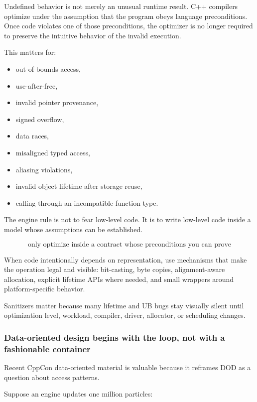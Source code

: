 Undefined behavior is not merely an unusual runtime result. C++ compilers optimize under the assumption that the program obeys language preconditions. Once code violates one of those preconditions, the optimizer is no longer required to preserve the intuitive behavior of the invalid execution.

This matters for:

\begin{itemize}
\tightlist
\item
  out-of-bounds access,
\item
  use-after-free,
\item
  invalid pointer provenance,
\item
  signed overflow,
\item
  data races,
\item
  misaligned typed access,
\item
  aliasing violations,
\item
  invalid object lifetime after storage reuse,
\item
  calling through an incompatible function type.
\end{itemize}

The engine rule is not to fear low-level code. It is to write low-level code inside a model whose assumptions can be established.

\[
\boxed{
\text{only optimize inside a contract whose preconditions you can prove}
}
\]

When code intentionally depends on representation, use mechanisms that make the operation legal and visible: bit-casting, byte copies, alignment-aware allocation, explicit lifetime APIs where needed, and small wrappers around platform-specific behavior.

Sanitizers matter because many lifetime and UB bugs stay visually silent until optimization level, workload, compiler, driver, allocator, or scheduling changes.

\subsubsection{Data-oriented design begins with the loop, not with a fashionable container}\label{01-foundations-i-ch005-data-oriented-design-begins-with-the-loop-not-with-a-fashionable-container}

Recent CppCon data-oriented material is valuable because it reframes DOD as a question about access patterns.

Suppose an engine updates one million particles:

